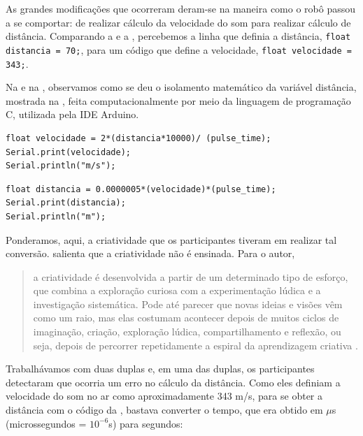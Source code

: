 \documentclass{textolivre}
\begin{document}
As grandes modificações que ocorreram deram-se na maneira como o robô passou a se comportar: de realizar cálculo da velocidade do som para realizar cálculo de distância. Comparando a  e a , percebemos a  linha que definia a distância, \lstinline{float distancia = 70;}, para um código que define a velocidade, \lstinline{float velocidade = 343;}. 

Na  e na , observamos como se deu o isolamento matemático da variável distância, mostrada na , feita computacionalmente por meio da linguagem de programação C, utilizada pela IDE Arduino.

\begin{lstlisting}[label=lst05, caption={Parte do código para cálculo da velocidade no Arduino.}, source={Arquivo pessoal.}]
float velocidade = 2*(distancia*10000)/ (pulse_time);
Serial.print(velocidade);
Serial.println("m/s");
\end{lstlisting} %

\begin{lstlisting}[label=lst06, caption={Parte do código para o cálculo da distância no Arduino.}, source={Arquivo pessoal.}]
float distancia = 0.0000005*(velocidade)*(pulse_time);
Serial.print(distancia);
Serial.println("m");
\end{lstlisting} %


Ponderamos, aqui, a criatividade que os participantes tiveram em realizar tal conversão. \textcite{resnick2020} salienta que a criatividade não é ensinada. Para o autor, 

\begin{quote}
a criatividade é desenvolvida a partir de um determinado tipo de esforço, que combina a exploração curiosa com a experimentação lúdica e a investigação sistemática. Pode até parecer que novas ideias e visões vêm como um raio, mas elas costumam acontecer depois de muitos ciclos de imaginação, criação, exploração lúdica, compartilhamento e reflexão, ou seja, depois de percorrer repetidamente a espiral da aprendizagem criativa \cite[p. 50]{resnick2020}.
\end{quote}

Trabalhávamos com duas duplas e, em uma das duplas, os participantes detectaram que ocorria um erro no cálculo da distância. Como eles definiam a velocidade do som no ar como aproximadamente 343 m/s, para se obter a distância com o código da , bastava converter o tempo, que era obtido em $\mu$s (microssegundos = $10^{-6}$s) para segundos:
\end{document}
